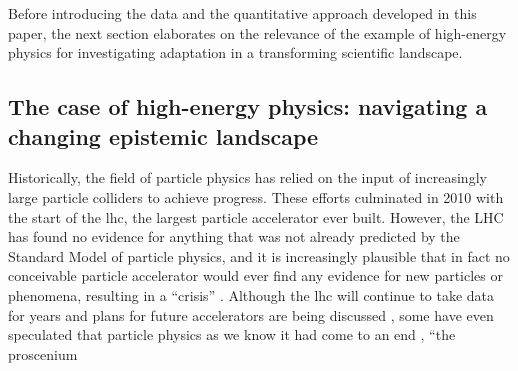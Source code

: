 \documentclass{article}
\begin{document}
Before introducing the data and the quantitative approach developed in this paper, the next section elaborates on the relevance of the example of high-energy physics for investigating adaptation in a transforming scientific landscape. 




\subsection{\label{sec:hep}The case of high-energy physics: navigating a changing epistemic landscape}

Historically, the field of particle physics has relied on the input of increasingly large particle colliders to achieve progress. These efforts culminated in 2010 with the start of the \gls{lhc}, the largest particle accelerator ever built. However, the LHC has found no evidence for anything that was not already predicted by the Standard Model of particle physics, and it is increasingly plausible that in fact no conceivable particle accelerator would ever find any evidence for new particles or phenomena, resulting in a ``crisis'' \citep{susy_crisis}. Although the \gls{lhc} will continue to take data for years and plans for future accelerators are being discussed \citep{Roser2023}, some have even speculated that particle physics as we know it had come to an end \citep{Harlander2023,Kosyakov2023}%
, ``the proscenium
\end{document}
